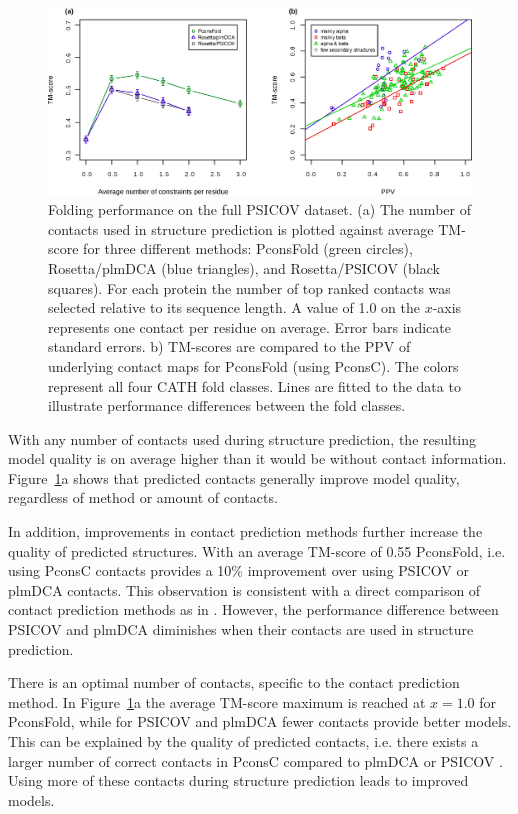 \documentclass{bioinfo}
\begin{document}
\begin{figure}[!tpb]%
\centerline{\includegraphics[scale=0.6]{figures/tmscores.eps}}
\caption{Folding performance on the full PSICOV dataset. (a) The 
 number of contacts used in structure prediction is
 plotted against average TM-score for three different methods:
 PconsFold (green circles), Rosetta/plmDCA (blue triangles), and
 Rosetta/PSICOV (black squares). For each protein the number of top
 ranked contacts was selected relative to its sequence length. A value
 of 1.0 on the $x$-axis represents one
 contact per residue on average. {\color{red}Error bars indicate
 standard errors.} b) TM-scores are compared
 to the PPV of underlying contact maps for PconsFold (using
 PconsC). The colors represent all four CATH fold classes. Lines 
 are fitted to the data to illustrate performance differences between the fold classes.}\label{fig:main}
\end{figure}

With any number of contacts used during structure prediction, the
resulting model quality is on average higher than it would be without
contact information. Figure~\ref{fig:main}a shows that predicted contacts generally improve model
quality, regardless of method or amount of contacts. 


{\color{red}In addition, improvements in contact prediction methods further increase the quality
of predicted structures.} With an average TM-score of 0.55
PconsFold, i.e. using PconsC contacts provides a 10\% improvement
over using PSICOV or plmDCA contacts. This observation is consistent
with a direct comparison of contact prediction methods as in
\citeauthor{skwark_PconsC:_2013}
\citeyear{skwark_PconsC:_2013}. However, the performance difference
between PSICOV and plmDCA diminishes when their contacts are used in
structure prediction. 


There is an optimal number of contacts, specific to the contact
prediction method. In Figure~\ref{fig:main}a the average TM-score
maximum is reached at $x=1.0$ for PconsFold, while for PSICOV and
plmDCA fewer contacts provide better models. This can be explained by
the quality of predicted contacts, i.e. there exists a larger number of
correct contacts in PconsC compared to plmDCA or PSICOV \cite[]{skwark_PconsC:_2013}. Using more of these contacts during
structure prediction leads to improved models.
\end{document}
